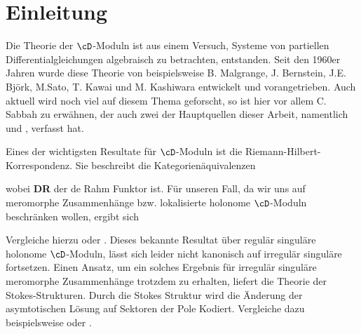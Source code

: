 \chapter{Einleitung}

Die Theorie der $\cD$-Moduln ist aus einem Versuch, Systeme von partiellen
Differentialgleichungen algebraisch zu betrachten, entstanden. Seit den 1960er
Jahren wurde diese Theorie von beispielsweise B. Malgrange, J. Bernstein, J.E.
Björk, M.Sato, T. Kawai und M. Kashiwara entwickelt und vorangetrieben.
Auch aktuell wird noch viel auf diesem Thema geforscht, so ist hier vor allem
C. Sabbah zu erwähnen, der auch zwei der Hauptquellen dieser Arbeit, namentlich
\cite{sabbah_cimpa90} und \cite{sabbah_Fourier-local}, verfasst hat.

Eines der wichtigsten Resultate für $\cD$-Moduln ist die
Riemann-Hilbert-Korrespondenz. Sie beschreibt die Kategorienäquivalenzen
\begin{center}
\end{center}
wobei \textbf{DR} der de Rahm Funktor ist.
Für unseren Fall, da wir uns auf meromorphe Zusammenhänge bzw. lokalisierte
holonome $\cD$-Moduln beschränken wollen, ergibt sich
\begin{center}
\end{center}
Vergleiche hierzu \cite[Sec 6]{REFKashiwara1984} oder \cite[Thm
7.2.1]{hotta2007d}.
Dieses bekannte Resultat über regulär singuläre holonome $\cD$-Moduln,
lässt sich leider nicht kanonisch auf irregulär singuläre fortsetzen.
Einen Ansatz, um ein solches Ergebnis für irregulär singuläre meromorphe
Zusammenhänge trotzdem zu erhalten, liefert die Theorie der Stokes-Strukturen.
Durch die Stokes Struktur wird die Änderung der asymtotischen Lösung auf
Sektoren der Pole Kodiert.
Vergleiche dazu beispielsweise \cite{sabbah2013introduction} oder
\cite{citeulike:8523004}.


